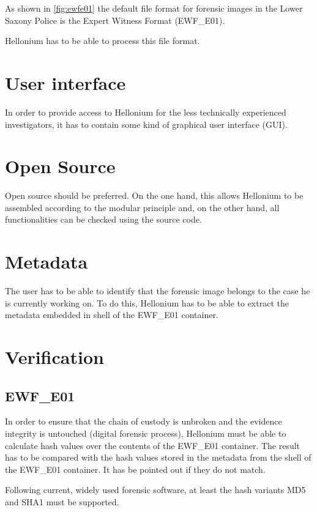 As shown in \cref{fig:ewfe01} the default file format for forensic images in the Lower Saxony Police is the Expert Witness Format (EWF\_E01). \cite{EWF}

Hellonium has to be able to process this file format.

\section{User interface}
\label{sec:gui}

In order to provide access to Hellonium for the less technically experienced investigators, it has to contain some kind of graphical user interface (GUI).

\section{Open Source}
\label{sec:oss}

Open source should be preferred. On the one hand, this allows Hellonium to be assembled according to the modular principle and, on the other hand, all functionalities can be checked using the source code.

\section{Metadata}
\label{sec:metadata}

The user has to be able to identify that the forensic image belongs to the case he is currently working on. To do this, Hellonium has to be able to extract the metadata embedded in shell of the EWF\_E01 container.

\section{Verification}
\label{sec:verification}

\subsection{EWF\_E01}

In order to ensure that the chain of custody is unbroken and the evidence integrity is untouched (digital forensic process), Hellonium must be able to calculate hash values over the contents of the EWF\_E01 container. The result has to be compared with the hash values stored in the metadata from the shell of the EWF\_E01 container. It has be pointed out if they do not match.

Following current, widely used forensic software, at least the hash variants MD5 and SHA1 must be supported.

